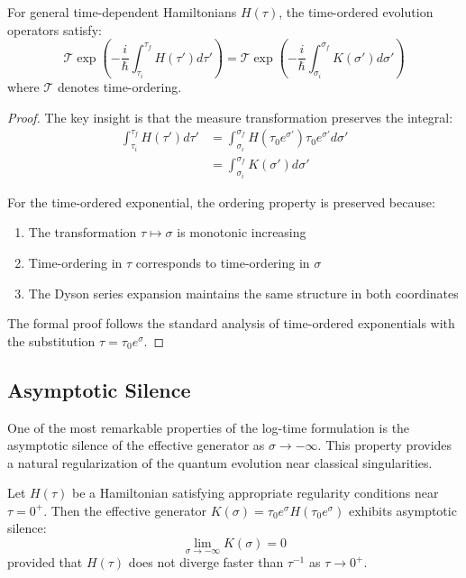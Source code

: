 \begin{theorem}
\label{thm:unitary_equiv_time_dependent}
For general time-dependent Hamiltonians $H(\tau)$, the time-ordered evolution operators satisfy:
\begin{equation}
\mathcal{T} \exp\left(-\frac{i}{\hbar}\int_{\tau_i}^{\tau_f} H(\tau') d\tau'\right) = \mathcal{T} \exp\left(-\frac{i}{\hbar}\int_{\sigma_i}^{\sigma_f} K(\sigma') d\sigma'\right)
\end{equation}
where $\mathcal{T}$ denotes time-ordering.
\end{theorem}

\begin{proof}
The key insight is that the measure transformation preserves the integral:
\begin{align}
\int_{\tau_i}^{\tau_f} H(\tau') d\tau' &= \int_{\sigma_i}^{\sigma_f} H(\tau_0 e^{\sigma'}) \tau_0 e^{\sigma'} d\sigma' \\
&= \int_{\sigma_i}^{\sigma_f} K(\sigma') d\sigma'
\end{align}

For the time-ordered exponential, the ordering property is preserved because:
\begin{enumerate}
\item The transformation $\tau \mapsto \sigma$ is monotonic increasing
\item Time-ordering in $\tau$ corresponds to time-ordering in $\sigma$
\item The Dyson series expansion maintains the same structure in both coordinates
\end{enumerate}

The formal proof follows the standard analysis of time-ordered exponentials with the substitution $\tau = \tau_0 e^\sigma$.
\end{proof}

\subsection{Asymptotic Silence}
\label{subsec:asymptotic_silence}

One of the most remarkable properties of the log-time formulation is the asymptotic silence of the effective generator as $\sigma \to -\infty$. This property provides a natural regularization of the quantum evolution near classical singularities.

\begin{theorem}
\label{thm:asymptotic_silence}
Let $H(\tau)$ be a Hamiltonian satisfying appropriate regularity conditions near $\tau = 0^+$. Then the effective generator $K(\sigma) = \tau_0 e^\sigma H(\tau_0 e^\sigma)$ exhibits asymptotic silence:
\begin{equation}
\lim_{\sigma \to -\infty} K(\sigma) = 0
\end{equation}
provided that $H(\tau)$ does not diverge faster than $\tau^{-1}$ as $\tau \to 0^+$.
\end{theorem}

